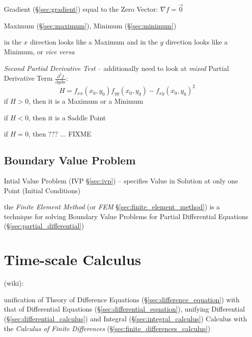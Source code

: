 Gradient (\S\ref{sec:gradient}) equal to the Zero Vector: $\nabla{f} = \vec{0}$

Maximum (\S\ref{sec:maximum}), Minimum (\S\ref{sec:minimum})

in the $x$ direction looks like a Maximum and in the $y$ direction looks like a
Minimum, or \emph{vice versa}

\emph{Second Partial Derivative Test} -- additionally need to look at
\emph{mixed} Partial Derivative Term
$\frac{\partial^2{f}}{\partial{y}\partial{x}}$:
\[
  H = f_{xx}(x_0,y_0)f_{yy}(x_0,y_0) - f_{xy}(x_0,y_0)^2
\]
if $H > 0$, then it is a Maximum or a Minimum

if $H < 0$, then it is a Saddle Point

if $H = 0$, then ??? ... FIXME



\subsection{Boundary Value Problem}\label{sec:boundary_value_problem}


\fist Intial Value Problem (IVP \S\ref{sec:ivp}) -- specifies Value in Solution
at only one Point (Initial Conditions)


\fist the \emph{Finite Element Method} (or \emph{FEM}
\S\ref{sec:finite_element_method}) is a technique for solving Boundary Value
Problems for Partial Differential Equations (\S\ref{sec:partial_differential})



\section{Time-scale Calculus}\label{sec:timescale_calculus}

(wiki):

unification of Theory of Difference Equations (\S\ref{sec:difference_equation})
with that of Differential Equations (\S\ref{sec:differential_equation}),
unifying Differential (\S\ref{sec:differential_calculus}) and Integral
(\S\ref{sec:integral_calculus}) Calculus with the \emph{Calculus of Finite
  Differences} (\S\ref{sec:finite_differences_calculus})

